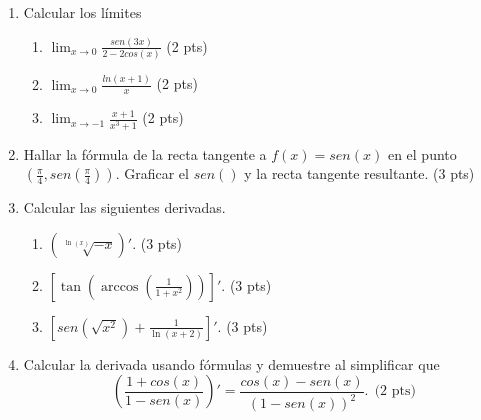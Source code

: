\documentclass[12pt,letterpaper]{article}
\begin{document}
  \begin{enumerate}
  \item Calcular los límites
  \begin{enumerate}
  \item $\lim_{x\to 0}  \frac{sen(3x)}{2-2cos(x)}$ (2 pts)
  \item $\lim_{x\to 0} \frac{ln(x+1)}{x}$ (2 pts)
  \item $\lim_{x\to -1} \frac{x+1}{x^3+1}$ (2 pts)
  \end{enumerate}
  \item  Hallar la f\'ormula de la recta tangente a $f(x)=sen(x)$
  en el punto $(\frac{\pi}{4},sen(\frac{\pi}{4}))$. Graficar el $sen()$ y la recta tangente resultante. (3 pts)
  \item Calcular las siguientes derivadas. 
  \begin{enumerate}
  \item $(\sqrt[\ln(x)]{-x})'$. (3 pts)
  \item $[\tan\left(\arccos(\frac{1}{1+x^2})\right)]'$. (3 pts)
  \item $[sen(\sqrt{x^2})+\frac{1}{\ln(x+2)}]'$. (3 pts)
  \end{enumerate}
  \item Calcular la derivada usando fórmulas y demuestre al simplificar que 
  $$
  \left(\frac{1+cos(x)}{1-sen(x)}\right)'=\frac{cos(x)-sen(x)}{(1-sen(x))^2}.\ \ \mbox{(2 pts)} $$
  \end{enumerate}
  
\end{document}
